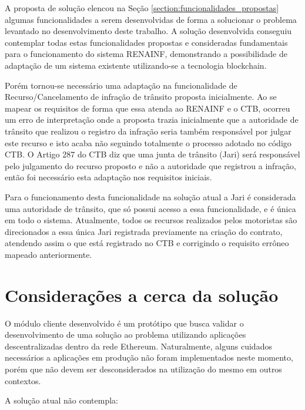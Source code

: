 A proposta de solução elencou na Seção \ref{section:funcionalidades_propostas} algumas funcionalidades a serem desenvolvidas de forma a solucionar o problema levantado no desenvolvimento deste trabalho. A solução desenvolvida conseguiu contemplar todas estas funcionalidades propostas e consideradas fundamentais para o funcionamento do sistema RENAINF, demonstrando a possibilidade de adaptação de um sistema existente utilizando-se a tecnologia blockchain.

Porém tornou-se necessário uma adaptação na funcionalidade de Recurso/Cancelamento de infração de trânsito proposta inicialmente. Ao se mapear os requisitos de forma que essa atenda ao RENAINF e o CTB, ocorreu um erro de interpretação onde a proposta trazia inicialmente que a autoridade de trânsito que realizou o registro da infração seria também responsável por julgar este recurso e isto acaba não seguindo totalmente o processo adotado no código CTB. O Artigo 287 do CTB diz que uma junta de trânsito (Jari) será responsável pelo julgamento do recurso proposto e não a autoridade que registrou a infração, então foi necessário esta adaptação nos requisitos iniciais.

Para o funcionamento desta funcionalidade na solução atual a Jari é considerada uma autoridade de trânsito, que só possui acesso a essa funcionalidade, e é única em todo o sistema. Atualmente, todos os recursos realizados pelos motoristas são direcionados a essa única Jari registrada previamente na criação do contrato, atendendo assim o que está registrado no CTB e corrigindo o requisito errôneo mapeado anteriormente.


\section{Considerações a cerca da solução}

O módulo cliente desenvolvido é um protótipo que busca validar o desenvolvimento de uma solução ao problema utilizando aplicações descentralizadas dentro da rede Ethereum. Naturalmente, alguns cuidados necessários a aplicações em produção não foram implementados neste momento, porém que não devem ser desconsiderados na utilização do mesmo em outros contextos.

A solução atual não contempla:

